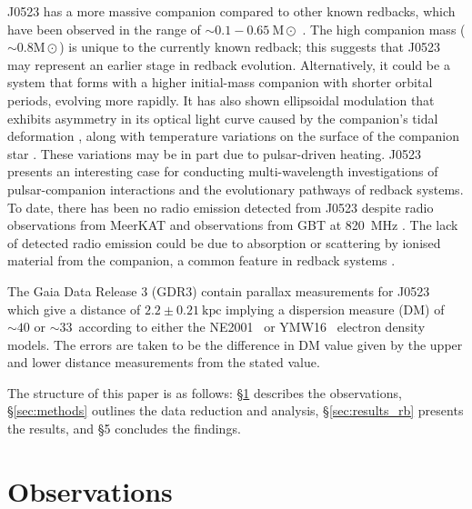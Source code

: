 J0523 has a more massive companion compared to other known redbacks, which have been observed in the range of $\sim 0.1 - 0.65~\text{M}\odot$ \citep{ATNFCat_2005,smedley_formation_2015, keane_survey_2018, koljonen_spidercat_2025}.  The high companion mass ($\sim 0.8 \text{M}\odot$) is unique to the currently known redback; this suggests that J0523 may represent an earlier stage in redback evolution. Alternatively, it could be a system that forms with a higher initial-mass companion with shorter orbital periods, evolving more rapidly. It has also shown ellipsoidal modulation that exhibits asymmetry in its optical light curve caused by the companion's tidal deformation \citep{strader_1fgl_2014}, along with temperature variations on the surface of the companion star \citep{halpern_luminous_2022, strader_1fgl_2014}. These variations may be in part due to pulsar-driven heating. J0523 presents an interesting case for conducting multi-wavelength investigations of pulsar-companion interactions and the evolutionary pathways of redback systems. To date, there has been no radio emission detected from J0523 despite radio observations from MeerKAT \citep{thongmeearkom_targeted_2024} and observations from GBT at 820~MHz \citep{SanpaArsa2016PhD}. The lack of detected radio emission could be due to absorption or scattering by ionised material from the companion, a common feature in redback systems \citep{zic_discovery_2024}. 

The Gaia Data Release 3 (GDR3) contain parallax measurements for J0523 which give a distance of $2.2 \pm 0.21~\text{kpc}$ implying a dispersion measure (DM) of $\sim 40$ or $\sim 33$~\dm according to either the \textsc{NE2001}~\citep{cordes_ne2001i_2003} or \textsc{YMW16}~\citep{yao_new_2017} electron density models. The errors are taken to be the difference in DM value given by the upper and lower distance measurements from the stated value.  

The structure of this paper is as follows: §\ref{sec:obs} describes the observations, §\ref{sec:methods} outlines the data reduction and analysis, §\ref{sec:results_rb} presents the results, and §5 concludes the findings.

\section{Observations} \label{sec:obs}


